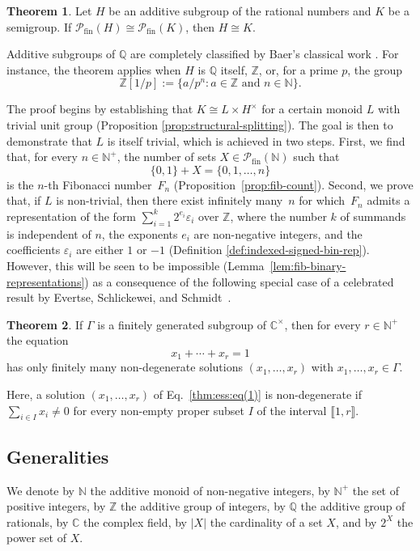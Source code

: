 \documentclass[11pt,reqno]{amsart}
\theoremstyle{definition}
\newtheorem{theorem}{Theorem}[section]
\theoremstyle{remark}
\theoremstyle{theoremdd}
\newcommand{\Pfin}{\mathcal P_{\mathrm{fin}}}
\providecommand\llb{\llbracket}
\providecommand\rrb{\rrbracket}
\newcommand{\evid}[1]{\textsf{#1}}
\providecommand\llb{\llbracket}
\providecommand\rrb{\rrbracket}
\renewcommand{\,}{\kern 0.1em}
\begin{document}
\begin{theorem}\label{thm:main}
Let $H$ be an additive subgroup of the rational numbers and $K$ be a semigroup. If $\Pfin(H) \cong \Pfin(K)$, then $H \cong K$.
\end{theorem}

Additive subgroups of $\mathbb{Q}$ are completely classified by Baer's classical work \cite{Bae-1937}. For instance, the theorem applies when
$H$ is $\mathbb Q$ itself, $\mathbb Z$, or, for a prime $p$, the group
\[
\mathbb Z[1/p] := \{a/p^n: a \in \mathbb Z \text{ and } n \in \mathbb N\}.
\]

The proof begins by establishing that $K \cong \allowbreak L \times H^\times$ for a certain monoid $L$ with trivial unit group (Proposition \ref{prop:structural-splitting}). The goal is then to demonstrate that $L$ is itself trivial, which is achieved in two steps. First, we find that, for every $n \in \mathbb{N}^+$, the number of sets 
$X \in \mathcal{P}_{\text{fin}}(\mathbb N)$ such that
\[
\{0, 1\} + X = \{0, 1, \ldots, n\}
\]
is the $n$-th Fibonacci number~$F_n$ (Proposition~\ref{prop:fib-count}). 
Second, we prove that, if $L$ is non-trivial, then there exist infinitely 
many~$n$ for which~$F_n$ admits a representation 
of the form $\sum_{i=1}^k 2^{e_i} \varepsilon_i$ over $\mathbb Z$, where the number $k$ 
of summands is independent of $n$, the exponents $e_i$ are non-negative 
integers, and the coefficients $\varepsilon_i$ are either $1$ or $-1$ (Definition \ref{def:indexed-signed-bin-rep}). However, 
this will be seen to be impossible (Lemma~\ref{lem:fib-binary-representations}) 
as a consequence of the following special case of a celebrated result by Evertse, Schlickewei, 
and Schmidt~\cite[Theorem 1.1]{ESS2002}.

\begin{theorem}\label{thm:ess}
If $\Gamma$ is a finitely generated subgroup of $\mathbb C^\times$, then for every $r \in \mathbb N^+$ the equation
\begin{equation}
\label{thm:ess:eq(1)}
x_1 + \cdots + x_r = 1
\end{equation}
has only finitely many non-degenerate solutions $(x_1, \ldots, x_r)$ with $x_1, \ldots, x_r \in \Gamma$.
\end{theorem}

Here, a solution $(x_1, \ldots, x_r)$ of Eq.~\eqref{thm:ess:eq(1)} is
\evid{non-degenerate} if $\sum_{i \in I} x_i \ne 0$ for every non-empty proper subset $I$ of the interval $\llb 1, r \rrb$.

\subsection*{Generalities} 
We denote by $\mathbb N$ the additive monoid of non-negative integers, by $\mathbb N^+$ the set of positive integers, by $\mathbb Z$ the additive group of integers, by $\mathbb Q$ the additive group of rationals, by $\mathbb C$ the complex field, by $|X|$ the cardinality of a set $X$, and by $2^X$ the power set of $X$.
\end{document}
